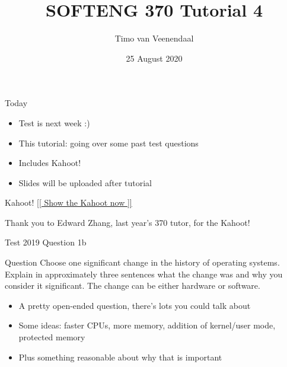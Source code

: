\documentclass[notes]{beamer}
\title{SOFTENG 370 Tutorial 4}
\author{Timo van Veenendaal}
\date{25 August 2020}
\begin{document}
\maketitle

\begin{frame}{Today}
    \begin{itemize}
        \item Test is next week :)
        \item This tutorial: going over some past test questions
        \item Includes Kahoot!
        \item Slides will be uploaded after tutorial
    \end{itemize}
\end{frame}
\begin{frame}{Kahoot!}
    \href{https://play.kahoot.it/v2/?quizId=d7c62e90-bd32-4e2f-99ec-e459d5c7f13d}{[[ Show the Kahoot now ]]}

    Thank you to Edward Zhang, last year's 370 tutor, for the Kahoot!
\end{frame}
\begin{frame}{Test 2019 Question 1b}
    \begin{alertblock}{Question}
        Choose one significant change in the history of operating systems. Explain in approximately three sentences what the change was and why you consider it significant. The change can be either hardware or software.
    \end{alertblock}
    \pause
    \begin{itemize}
        \item A pretty open-ended question, there's lots you could talk about
        \item Some ideas: faster CPUs, more memory, addition of kernel/user mode, protected memory
        \item Plus something reasonable about why that is important
    \end{itemize}
\end{frame}
\end{document}
